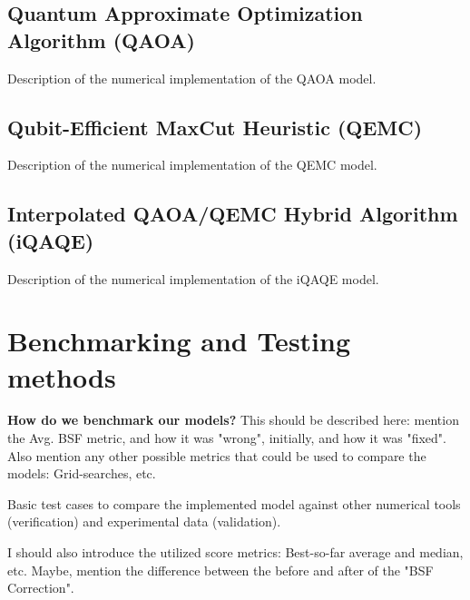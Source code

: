 \subsection{Quantum Approximate Optimization Algorithm (QAOA)}
\label{subsection:QAOA_Implementation}

Description of the numerical implementation of the QAOA model.


\subsection{Qubit-Efficient MaxCut Heuristic (QEMC)}
\label{subsection:QEMC_Implementation}

Description of the numerical implementation of the QEMC model.


\subsection{Interpolated QAOA/QEMC Hybrid Algorithm (iQAQE)}
\label{subsection:iQAQE_Implementation}

Description of the numerical implementation of the iQAQE model.

\section{Benchmarking and Testing methods}
\label{section:Benchmarking_Testing}

\textbf{How do we benchmark our models?} This should be described here: mention the Avg. BSF metric, and how it was "wrong", initially, and how it was "fixed". Also mention any other possible metrics that could be used to compare the models: Grid-searches, etc.

Basic test cases to compare the implemented model against other numerical tools (verification) and experimental data (validation).

I should also introduce the utilized score metrics: Best-so-far average and median, etc. Maybe, mention the difference between the before and after of the "BSF Correction".  

